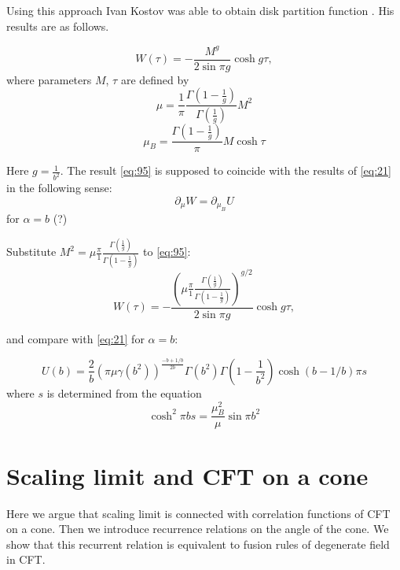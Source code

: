 \documentclass[12pt]{article}
\begin{document}
Using this approach Ivan Kostov was able to obtain disk partition function
\cite{kostov2004boundary,kostov2003boundary}. His results are as follows. 

\begin{equation}
  \label{eq:95}
  W(\tau) = -\frac{M^{g}}{2\sin \pi g} \cosh g\tau,
\end{equation}
where parameters $M$, $\tau$ are defined by
\begin{equation}
  \label{eq:96}
  \mu=\frac{1}{\pi} \frac{\Gamma\left(1-\frac{1}{g}\right)}{\Gamma\left(\frac{1}{g}\right)} M^{2}
\end{equation}
\begin{equation}
  \label{eq:97}
  \mu_{B}=\frac{\Gamma\left(1-\frac{1}{g}\right)}{\pi} M\cosh \tau
\end{equation}

Here $g=\frac{1}{b^{2}}$. The result \eqref{eq:95} is supposed to coincide with the results of
\cite{fateev2000boundary} \eqref{eq:21} in the following sense:
\begin{equation}
  \label{eq:98}
  \partial_{\mu} W = \partial_{\mu_{B}} U
\end{equation}
for $\alpha=b$ (?)

Substitute $  M^{2}=\mu\frac{\pi}{1}
\frac{\Gamma\left(\frac{1}{g}\right)}{\Gamma\left(1-\frac{1}{g}\right)}$ to \eqref{eq:95}:
\begin{equation}
  \label{eq:83}
  W(\tau) = -\frac{\left(\mu\frac{\pi}{1}
\frac{\Gamma\left(\frac{1}{g}\right)}{\Gamma\left(1-\frac{1}{g}\right)}\right)^{g/2}}{2\sin \pi g} \cosh g\tau,
\end{equation}

and compare with \eqref{eq:21} for $\alpha=b$: 

\begin{equation}
  U(b)=\frac{2}{b} \left(\pi\mu\gamma( b^{2})\right)^{\frac{-b+1/b}{2b}} \Gamma(b^{2})
  \Gamma\left(1-\frac{1}{b^{2}}\right) \cosh (b-1/b)\pi s
\end{equation}
where $s$ is determined from the equation
\begin{equation}
  \cosh^{2} \pi b s=\frac{\mu_{B}^{2}}{\mu}\sin \pi b^{2}
\end{equation}


\section{Scaling limit and CFT on a cone}
\label{sec:scaling-limit-cft}

Here we argue that scaling limit is connected with correlation
functions of CFT on a cone. Then we introduce recurrence relations on
the angle of the cone. We show that this recurrent relation is
equivalent to fusion rules of degenerate field in CFT. 
\end{document}
